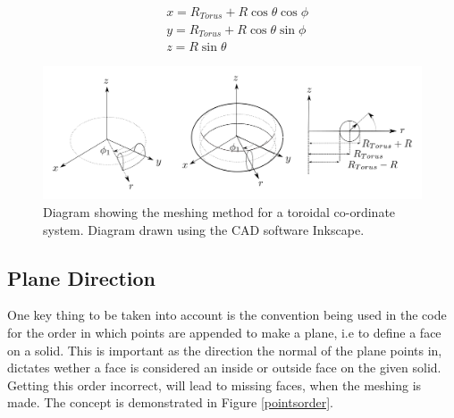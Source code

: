 \documentclass[12pt,a4paper]{article}
\begin{document}
\begin{equation}
\begin{aligned}
& x = R_{Torus} + R\cos{\theta}\cos{\phi} \\
& y = R_{Torus} + R\cos{\theta}\sin{\phi} \\
& z =  R\sin{\theta} 
\end{aligned}
\end{equation}

\begin{figure}[h!]
\centering
\includegraphics[scale=0.35]{Images//Coords/torus_coords.png}
\caption[width=\columnwidth]{Diagram showing the meshing method for a toroidal co-ordinate system. Diagram drawn using the CAD software Inkscape.}
\label{tormeshin}
\end{figure}

\subsection{Plane Direction}
\label{order}
One key thing to be taken into account is the convention being used in the code for the order in which points are appended to make a plane, i.e to define a face on a solid. This is important as the direction the normal of the plane points in, dictates wether a face is considered an inside or outside face on the given solid. Getting this order incorrect, will lead to missing faces, when the meshing is made. The concept is demonstrated in Figure \ref{pointsorder}.
\end{document}
